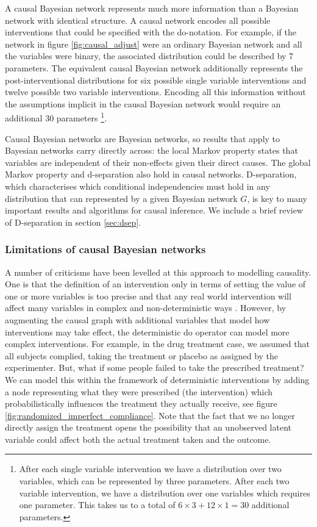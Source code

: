 \documentclass[11pt,a4paper,oneside]{book}
\theoremstyle{plain}
\theoremstyle{definition}
\begin{document}
A causal Bayesian network represents much more information than a Bayesian network with identical structure. A causal network encodes all possible interventions that could be specified with the do-notation. For example, if the network in figure \ref{fig:causal_adjust} were an ordinary Bayesian network and all the variables were binary, the associated distribution could be described by 7 parameters. The equivalent causal Bayesian network additionally represents the post-interventional distributions for six possible single variable interventions and twelve possible two variable interventions. Encoding all this information without the assumptions implicit in the causal Bayesian network would require an additional 30 parameters \footnote{After each single variable intervention we have a distribution over two variables, which can be represented by three parameters. After each two variable intervention, we have a distribution over one variables which requires one parameter. This takes us to a total of $6\times3+12\times1 = 30$ additional parameters.}.

Causal Bayesian networks are Bayesian networks, so results that apply to Bayesian networks carry directly across: the local Markov property states that variables are independent of their non-effects given their direct causes. The global Markov property and d-separation also hold in causal networks. D-separation, which characterises which conditional independencies must hold in any distribution that can represented by a given Bayesian network $G$, is key to many important results and algorithms for causal inference. We include a brief review of D-separation in section \ref{sec:dsep}. 


\subsubsection{Limitations of causal Bayesian networks}
A number of criticisms have been levelled at this approach to modelling causality. One is that the definition of an intervention only in terms of setting the value of one or more variables is too precise and that any real world intervention will affect many variables in complex and non-deterministic ways \citep{rickles2009causality,cartwright2007hunting}. However, by augmenting the causal graph with additional variables that model how interventions may take effect, the deterministic do operator can model more complex interventions. For example, in the drug treatment case, we assumed that all subjects complied, taking the treatment or placebo as assigned by the experimenter. But, what if some people failed to take the prescribed treatment? We can model this within the framework of deterministic interventions by adding a node representing what they were prescribed (the intervention) which probabilistically influences the treatment they actually receive, see figure \ref{fig:randomized_imperfect_compliance}. Note that the fact that we no longer directly assign the treatment opens the possibility that an unobserved latent variable could affect both the actual treatment taken and the outcome.
\end{document}
